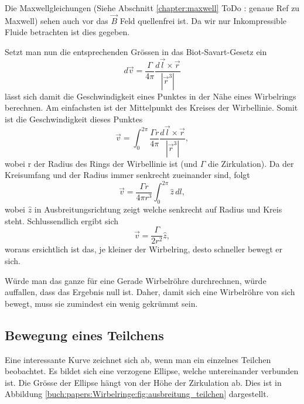 Die Maxwellgleichungen (Siehe Abschnitt \ref{chapter:maxwell} ToDo : genaue Ref zu Maxwell) sehen auch vor das \(\vec{B}\) Feld quellenfrei ist. 
Da wir nur Inkompressible Fluide betrachten ist dies gegeben.

Setzt man nun die entsprechenden Grössen in das Biot-Savart-Gesetz ein 
\[
d \vec{v}
=
\frac{\Gamma}{4\pi}\frac{d \vec{l} \times \vec{r}}{\left\lvert \vec{r}^{3}\right\rvert }
\]
lässt sich damit die Geschwindigkeit eines Punktes in der Nähe eines Wirbelrings berechnen. 
Am einfachsten ist der Mittelpunkt des Kreises der Wirbellinie. 
Somit ist die Geschwindigkeit dieses Punktes
\[
\vec{v}
=
\int_{0}^{2\pi} \frac{\Gamma r}{4\pi}\frac{d \vec{l} \times \vec{r}}{\left\lvert \vec{r}^{3}\right\rvert },
\]
wobei r der Radius des Rings der Wirbellinie ist (und \(\Gamma\) die Zirkulation). 
Da der Kreisumfang und der Radius immer senkrecht zueinander sind, folgt 
\[
\vec{v}
=
\frac{\Gamma r}{4\pi r^{3}} \int_{0}^{2\pi} \hat{z}\, dl,
\]
wobei \(\hat{z}\) in Ausbreitungsrichtung zeigt welche senkrecht auf Radius und Kreis steht. 
Schlussendlich ergibt sich
\[
\vec{v}
=
\frac{\Gamma }{2 r^2}\hat{z},
\]
woraus ersichtlich ist das, je kleiner der Wirbelring, desto schneller bewegt er sich.

Würde man das ganze für eine Gerade Wirbelröhre durchrechnen, würde auffallen, dass das Ergebnis null ist. 
Daher, damit sich eine Wirbelröhre von sich bewegt, muss sie zumindest ein wenig gekrümmt sein.

\subsection{Bewegung eines Teilchens}



Eine interessante Kurve zeichnet sich ab, wenn man ein einzelnes Teilchen beobachtet. 
Es bildet sich eine verzogene Ellipse, welche untereinander verbunden ist. 
Die Grösse der Ellipse hängt von der Höhe der Zirkulation ab. 
Dies ist in Abbildung \ref{buch:papers:Wirbelringe:fig:ausbreitung_teilchen} dargestellt.
